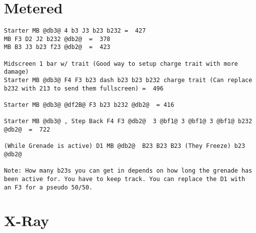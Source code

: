 \documentclass[main.tex]{subfiles}
\begin{document}
\section{Metered}


\begin{lstlisting}[language=FG]
Starter MB @db3@ 4 b3 J3 b23 b232 =  427
MB F3 D2 J2 b232 @db2@  =  378
MB B3 J3 b23 f23 @db2@  =  423

Midscreen 1 bar w/ trait (Good way to setup charge trait with more damage)
Starter MB @db3@ F4 F3 b23 dash b23 b23 b232 charge trait (Can replace b232 with 213 to send them fullscreen) =  496

Starter MB @db3@ @df2B@ F3 b23 b232 @db2@  = 416

Starter MB @db3@ , Step Back F4 F3 @db2@  3 @bf1@ 3 @bf1@ 3 @bf1@ b232 @db2@  =  722

(While Grenade is active) D1 MB @db2@  B23 B23 B23 (They Freeze) b23 @db2@ 

Note: How many b23s you can get in depends on how long the grenade has been active for. You have to keep track. You can replace the D1 with an F3 for a pseudo 50/50.
\end{lstlisting}

\section{X-Ray}
\begin{lstlisting}[language=FG]

\end{lstlisting}
\end{document}
